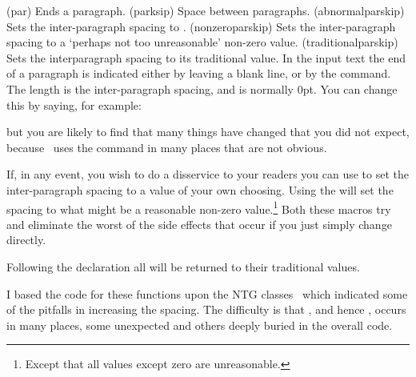 \begin{syntax}
 \\
\lnc{\parskip} \\
\cmd{\abnormalparskip} \\
\cmd{\nonzeroparskip} \\
\cmd{\traditionalparskip} \\
\end{syntax}
\glossary(par)%
  {}%
  {Ends a paragraph.}
\glossary(parksip)%
  {}%
  {Space between paragraphs.}
\glossary(abnormalparskip)%
  {}%
  {Sets the inter-paragraph spacing to .}
\glossary(nonzeroparskip)%
  {}%
  {Sets the inter-paragraph spacing to a `perhaps not too unreasonable' non-zero value.}
\glossary(traditionalparskip)%
  {}%
  {Sets the interparagraph spacing to its traditional value.}
In the input text the end of a paragraph is indicated either by leaving
a blank line, or by the  command. 
The length \lnc{\parskip} is the inter-paragraph spacing, and is normally 0pt.
You can change this by saying, for example:
\begin{lcode}
\setlength{\parskip}{2\baselineskip}
\end{lcode}
but you are likely to find that many things have changed that you
did not expect, because \ltx\ uses the  command in many
places that are not obvious.

If, in any event, you wish to do a disservice to your readers you can use 
\cmd{\abnormalparskip} to set the inter-paragraph spacing to
a value of your own choosing. Using the \cmd{\nonzeroparskip} will set
the spacing to  what might be a reasonable non-zero value.\footnote{Except
that all values except zero are unreasonable.} 
Both these macros try and eliminate the worst of the side effects that occur
if you just simply change \lnc{\parskip} directly.

Following the \cmd{\traditionalparskip} declaration all will be returned 
to their traditional values. 

    I based the code for these functions upon the NTG classes~\cite{NTG}
which indicated some of the pitfalls in increasing the spacing. The difficulty
is that , and hence \lnc{\parskip}, occurs in many places, some
unexpected and others deeply buried in the overall code.



